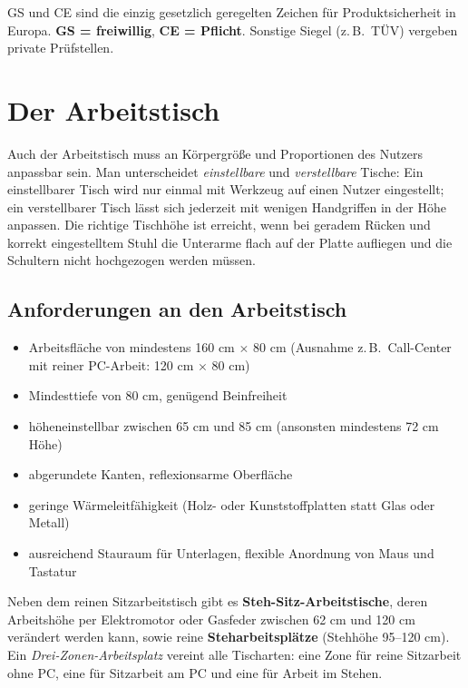 \documentclass[11pt, a4paper]{article}
\begin{document}
\begin{merksatz}
GS und CE sind die einzig gesetzlich geregelten Zeichen für Produktsicherheit in Europa.
\textbf{GS = freiwillig}, \textbf{CE = Pflicht}. Sonstige Siegel (z.\,B.\ TÜV) vergeben
private Prüfstellen.
\end{merksatz}

\section{Der Arbeitstisch}

Auch der Arbeitstisch muss an Körpergröße und Proportionen des Nutzers anpassbar sein. Man
unterscheidet \emph{einstellbare} und \emph{verstellbare} Tische: Ein einstellbarer Tisch
wird nur einmal mit Werkzeug auf einen Nutzer eingestellt; ein verstellbarer Tisch lässt
sich jederzeit mit wenigen Handgriffen in der Höhe anpassen. Die richtige Tischhöhe ist
erreicht, wenn bei geradem Rücken und korrekt eingestelltem Stuhl die Unterarme flach auf
der Platte aufliegen und die Schultern nicht hochgezogen werden müssen.

\subsection{Anforderungen an den Arbeitstisch}

\begin{itemize}
  \item Arbeitsfläche von mindestens 160 cm $\times$ 80 cm (Ausnahme z.\,B.\ Call-Center
    mit reiner PC-Arbeit: 120 cm $\times$ 80 cm)
  \item Mindesttiefe von 80 cm, genügend Beinfreiheit
  \item höheneinstellbar zwischen 65 cm und 85 cm (ansonsten mindestens 72 cm Höhe)
  \item abgerundete Kanten, reflexionsarme Oberfläche
  \item geringe Wärmeleitfähigkeit (Holz- oder Kunststoffplatten statt Glas oder Metall)
  \item ausreichend Stauraum für Unterlagen, flexible Anordnung von Maus und Tastatur
\end{itemize}

Neben dem reinen Sitzarbeitstisch gibt es \textbf{Steh-Sitz-Arbeitstische}, deren
Arbeitshöhe per Elektromotor oder Gasfeder zwischen 62 cm und 120 cm verändert werden kann,
sowie reine \textbf{Steharbeitsplätze} (Stehhöhe 95--120 cm). Ein \emph{Drei-Zonen-Arbeitsplatz}
vereint alle Tischarten: eine Zone für reine Sitzarbeit ohne PC, eine für Sitzarbeit am PC
und eine für Arbeit im Stehen.
\end{document}
